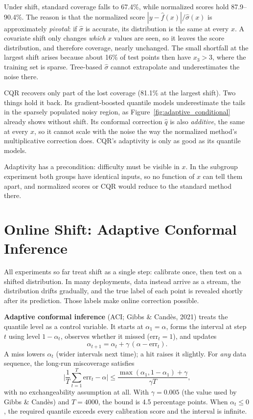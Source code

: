 \documentclass[11pt]{article}
\begin{document}
Under shift, standard coverage falls to 67.4\%, while normalized scores hold
87.9--90.4\%. The reason is that the normalized score $|y - \hat f(x)|/\hat\sigma(x)$
is approximately \emph{pivotal}: if $\hat\sigma$ is accurate, its distribution is
the same at every $x$. A covariate shift only changes \emph{which} $x$ values are
seen, so it leaves the score distribution, and therefore coverage, nearly unchanged.
The small shortfall at the largest shift arises because about 16\% of test points
then have $x_3 > 3$, where the training set is sparse. Tree-based $\hat\sigma$ cannot
extrapolate and underestimates the noise there.

CQR recovers only part of the lost coverage (81.1\% at the largest shift). Two
things hold it back. Its gradient-boosted quantile models underestimate the tails in
the sparsely populated noisy region, as Figure~\ref{fig:adaptive_conditional}
already shows without shift. Its conformal correction $\hat q$ is also
\emph{additive}, the same at every $x$, so it cannot scale with the noise the way the
normalized method's multiplicative correction does. CQR's adaptivity is only as good
as its quantile models.

Adaptivity has a precondition: difficulty must be visible in $x$. In the subgroup
experiment both groups have identical inputs, so no function of $x$ can tell them
apart, and normalized scores or CQR would reduce to the standard method there.

\section{Online Shift: Adaptive Conformal Inference}
\label{sec:online}

All experiments so far treat shift as a single step: calibrate once, then test on a
shifted distribution. In many deployments, data instead arrive as a stream, the
distribution drifts gradually, and the true label of each point is revealed shortly
after its prediction. Those labels make online correction possible.

\textbf{Adaptive conformal inference} (ACI; Gibbs \& Cand\`es, 2021) treats the
quantile level as a control variable. It starts at $\alpha_1 = \alpha$, forms the
interval at step $t$ using level $1-\alpha_t$, observes whether it missed
($\text{err}_t = 1$), and updates
\[
  \alpha_{t+1} = \alpha_t + \gamma\,(\alpha - \text{err}_t).
\]
A miss lowers $\alpha_t$ (wider intervals next time); a hit raises it slightly. For
\emph{any} data sequence, the long-run miscoverage satisfies
\[
  \Big|\frac1T\sum_{t=1}^T \text{err}_t - \alpha\Big| \le
  \frac{\max(\alpha_1, 1-\alpha_1) + \gamma}{\gamma T},
\]
with no exchangeability assumption at all. With $\gamma = 0.005$ (the value used by
Gibbs \& Cand\`es) and $T = 4000$, the bound is 4.5 percentage points. When
$\alpha_t \le 0$, the required quantile exceeds every calibration score and the
interval is infinite.
\end{document}
